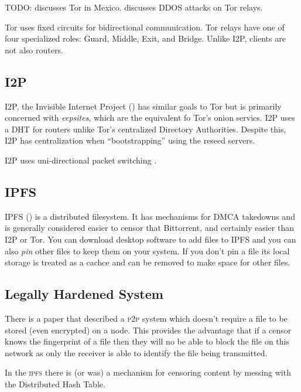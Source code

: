 TODO: \cite{iszaevichDistributedDetectionTor2019} discusses Tor in Mexico.
\cite{hollerCaseStudyDDoS2024} discusses DDOS attacks on Tor relays.


Tor uses fixed circuits for bidirectional
communication.\cite{AnalyzingTrendsTor} Tor relays have one of four specialized
roles: Guard, Middle, Exit, and Bridge. Unlike I2P, clients are not also
routers.

\subsection{I2P}\label{i2p}

I2P, the Invisible Internet Project (\cite{I2PAnonymousNetwork}) has similar
goals to Tor but is primarily concerned with \emph{eepsites}, which are the
equivalent fo Tor's onion servics. I2P uses a DHT for routers unlike Tor's
centralized Directory Authorities.\cite{NetworkDatabaseI2P} Despite this, I2P
has centralization when ``bootstrapping'' using the reseed servers.

I2P uses uni-directional packet switching \cite{I2PComparedTor}.

\subsection{IPFS}\label{ipfs}

IPFS (\cite{IPFSBuildingBlocks}) is a distributed filesystem. It has mechanisms
for DMCA takedowns and is generally considered easier to censor that Bittorrent,
and certainly easier than I2P or Tor. You can download desktop software to add
files to IPFS and you can also \emph{pin} other files to keep them on your
system. If you don't pin a file its local storage is treated as a cachce
\cite{HostSinglepageWebsite} and can be removed to make space for other files.

\subsection{Legally Hardened System}

There is a paper that described a \textsc{p2p} system which doesn't require a
file to be stored (even encrypted) on a
node.\cite{CensorshipresistantAnonymousP2P} This provides the advantage that if
a censor knows the fingerprint of a file then they will no be able to block the
file on this network as only the receiver is able to identify the file being
transmitted.


In the \textsc{ipfs} there is (or was) a mechanism for censoring content by
messing with the Distributed Hash
Table.\cite{sridharContentCensorshipInterPlanetary2023}

